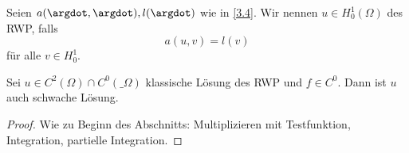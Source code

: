 \begin{df} \label{3.24}
	Seien $a(\argdot, \argdot), l(\argdot)$ wie in \ref{3.4}.
	Wir nennen $u \in H_0^1(\Omega)$  des RWP, falls
	\begin{equation} \label{eq:3.5}
		a(u,v) = l(v)
	\end{equation}
	für alle $v \in H_0^1$.
\end{df}

\begin{st} \label{3.25}
	Sei $u \in C^2(\Omega) \cap C^0(\_\Omega)$ klassische Lösung des RWP und $f \in C^0$.
	Dann ist $u$ auch schwache Lösung.
	\begin{proof}
		Wie zu Beginn des Abschnitts:
		Multiplizieren mit Testfunktion, Integration, partielle Integration.
	\end{proof}
\end{st}

